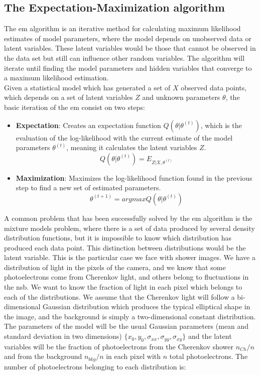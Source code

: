 \documentclass[main.tex]{subfiles}
\begin{document}
\subsection{The Expectation-Maximization algorithm} \label{sec:em}

The \gls{em} algorithm \cite{1977EM} is an iterative method for calculating maximum likelihood estimates of model parameters, where the model depends on unobserved data or latent variables. These latent variables would be those that cannot be observed in the data set but still can influence other random variables. The algorithm will iterate until finding the model parameters and hidden variables that converge to a maximum likelihood estimation.\\
Given a statistical model which has generated a set of $X$ observed data points, which depends on a set of latent variables $Z$ and unknown parameters $\theta$, the basic iteration of the \gls{em} consist on two steps:

\begin{itemize}
\item \textbf{Expectation}: Creates an expectation function $Q(\theta | \theta^{(t)})$, which is the evaluation of the log-likelihood with the current estimate of the model parameters $\theta^{(t)}$, meaning it calculates the latent variables $Z$.
  \begin{equation}
    Q(\theta | \theta^{(t)}) = E_{Z|X,\theta^(t)}
  \end{equation}

\item \textbf{Maximization}: Maximizes the log-likelihood function found in the previous step to find a new set of estimated parameters.
  \begin{equation}
    \theta^{(t+1)} = arg max Q(\theta | \theta^{(t)})
  \end{equation}
\end{itemize}

A common problem that has been successfully solved by the \gls{em} algorithm is the mixture models problem, where there is a set of data produced by several density distribution functions, but it is impossible to know which distribution has produced each data point. This distinction between distributions would be the latent variable. This is the particular case we face with shower images. We have a distribution of light in the pixels of the camera, and we know that some photoelectrons come from Cherenkov light, and others belong to fluctuations in the \gls{nsb}. We want to know the fraction of light in each pixel which belongs to each of the distributions.
We assume that the Cherenkov light will follow a bi-dimensional Gaussian distribution which produces the typical elliptical shape in the image, and the background is simply a two-dimensional constant distribution. The parameters of the model will be the usual Gaussian parameters (mean and standard deviation in two dimensions) $\{x_{0}, y_{0},\sigma_{xx}, \sigma_{yy}, \sigma_{xy}\}$ and the latent variables will be the fraction of photoelectrons from the Cherenkov shower $n_{Ch}/n$ and from the background $n_{bkg}/n$ in each pixel with $n$ total photoelectrons.
The number of photoelectrons belonging to each distribution is:
\end{document}
